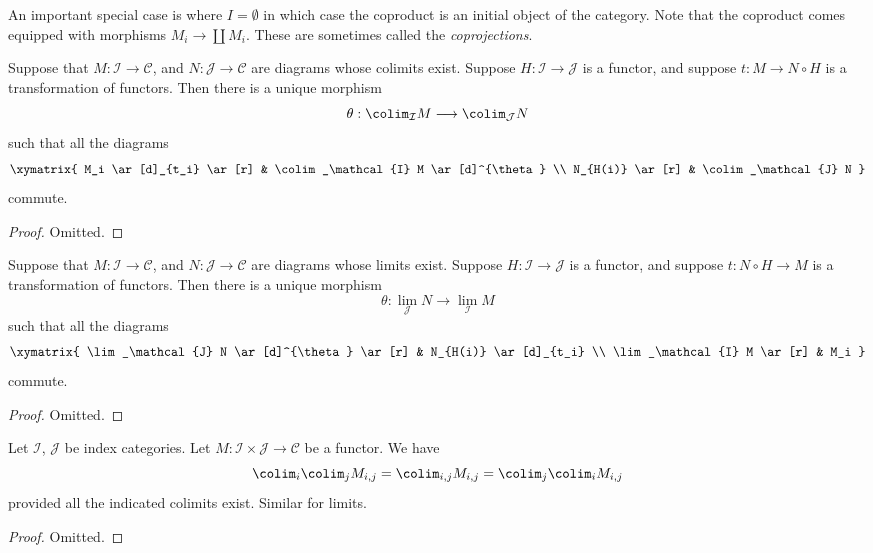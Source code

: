 \noindent
An important special case is where $I = \emptyset$ in which case the
coproduct is an initial object of the category.
Note that the coproduct comes equipped with morphisms
$M_i \to \coprod M_i$. These are sometimes called the
{\it coprojections}.

\begin{lemma}
\label{lemma-functorial-colimit}
Suppose that $M : \mathcal{I} \to \mathcal{C}$,
and $N : \mathcal{J} \to \mathcal{C}$ are diagrams
whose colimits exist. Suppose
$H : \mathcal{I} \to \mathcal{J}$ is
a functor, and suppose $t : M \to N \circ H$
is a transformation of functors.
Then there is a unique morphism
$$
\theta :
\colim_\mathcal{I} M
\longrightarrow
\colim_\mathcal{J} N
$$
such that all the diagrams
$$
\xymatrix{
M_i \ar[d]_{t_i} \ar[r]
&
\colim_\mathcal{I} M \ar[d]^{\theta}
\\
N_{H(i)} \ar[r]
&
\colim_\mathcal{J} N
}
$$
commute.
\end{lemma}

\begin{proof}
Omitted.
\end{proof}

\begin{lemma}
\label{lemma-functorial-limit}
Suppose that $M : \mathcal{I} \to \mathcal{C}$,
and $N : \mathcal{J} \to \mathcal{C}$ are diagrams
whose limits exist. Suppose $H : \mathcal{I} \to \mathcal{J}$ is
a functor, and suppose $t : N \circ H \to M$
is a transformation of functors.
Then there is a unique morphism
$$
\theta :
\lim_\mathcal{J} N
\longrightarrow
\lim_\mathcal{I} M
$$
such that all the diagrams
$$
\xymatrix{
\lim_\mathcal{J} N \ar[d]^{\theta} \ar[r]
&
N_{H(i)} \ar[d]_{t_i}
\\
\lim_\mathcal{I} M \ar[r]
&
M_i
}
$$
commute.
\end{lemma}

\begin{proof}
Omitted.
\end{proof}


\begin{lemma}
\label{lemma-colimits-commute}
Let $\mathcal{I}$, $\mathcal{J}$ be index categories.
Let $M : \mathcal{I} \times \mathcal{J} \to \mathcal{C}$ be a functor.
We have
$$
\colim_i \colim_j M_{i, j}
=
\colim_{i, j} M_{i, j}
=
\colim_j \colim_i M_{i, j}
$$
provided all the indicated colimits exist. Similar for limits.
\end{lemma}

\begin{proof}
Omitted.
\end{proof}

